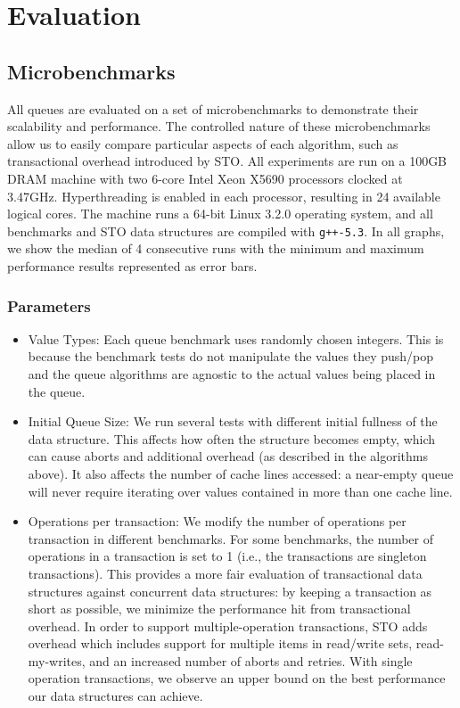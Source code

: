 \section{Evaluation}

\subsection{Microbenchmarks}
\label{q_microbenchmarks}

All queues are evaluated on a set of microbenchmarks to demonstrate their scalability and performance. The controlled nature of these microbenchmarks allow us to easily compare particular aspects of each algorithm, such as transactional overhead introduced by STO. All experiments are run on a 100GB DRAM machine with two 6-core Intel Xeon X5690 processors clocked at 3.47GHz. Hyperthreading is enabled in each processor, resulting in 24 available logical cores. The machine runs a 64-bit Linux 3.2.0 operating system, and all benchmarks and STO data structures are compiled with \texttt{g++-5.3}. In all graphs, we show the median of 4 consecutive runs with the minimum and maximum performance results represented as error bars.

\subsubsection{Parameters}

\begin{itemize}
\item Value Types: Each queue benchmark uses randomly chosen integers. This is because the benchmark tests do not manipulate the values they push/pop and the queue algorithms are agnostic to the actual values being placed in the queue.

\item Initial Queue Size: We run several tests with different initial fullness of the data structure. This affects how often the structure becomes empty, which can cause aborts and additional overhead (as described in the algorithms above). It also affects the number of cache lines accessed: a near-empty queue will never require iterating over values contained in more than one cache line.

\item Operations per transaction: We modify the number of operations per transaction in different benchmarks. For some benchmarks, the number of operations in a transaction is set to 1 (i.e., the transactions are singleton transactions). This provides a more fair evaluation of transactional data structures against concurrent data structures: by keeping a transaction as short as possible, we minimize the performance hit from transactional overhead. In order to support multiple-operation transactions, STO adds overhead which includes support for multiple items in read/write sets, read-my-writes, and an increased number of aborts and retries. With single operation transactions, we observe an upper bound on the best performance our data structures can achieve.

\end{itemize}

